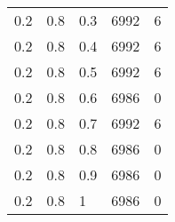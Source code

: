 \begin{table}[ht]
\begin{tabular}{ | l | l | l | l | l |}
		0.2      & 0.8     & 0.3 & 6992      & 6       \\
		0.2      & 0.8     & 0.4 & 6992      & 6       \\
		0.2      & 0.8     & 0.5 & 6992      & 6       \\
		0.2      & 0.8     & 0.6 & 6986      & 0       \\
		0.2      & 0.8     & 0.7 & 6992      & 6       \\
		0.2      & 0.8     & 0.8 & 6986      & 0       \\
		0.2      & 0.8     & 0.9 & 6986      & 0       \\
		0.2      & 0.8     & 1   & 6986      & 0       \\
		\hline
	\end{tabular}
\end{table}

